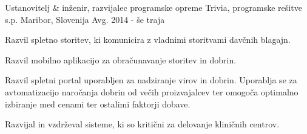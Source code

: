 \begin{cventries}
  \cventry
    {Ustanovitelj \& inženir, razvijalec programske opreme} %
    {Trivia, programske rešitve s.p.} %
    {Maribor, Slovenija} %
    {Avg. 2014 - še traja} %
    {
      \begin{cvitems} %
        \item {Razvil spletno storitev, ki komunicira z vladnimi storitvami
         davčnih blagajn.}
        \item {Razvil mobilno aplikacijo za obračunavanje storitev in dobrin.}
        \item {Razvil spletni portal uporabljen za nadziranje virov in dobrin.
         Uporablja se za avtomatizacijo naročanja dobrin od večih
          proizvajalcev ter omogoča optimalno izbiranje med cenami
           ter ostalimi faktorji dobave.}
        \item {Razvijal in vzdrževal sisteme, ki so kritični za delovanje
         kliničnih centrov.}
      \end{cvitems}
    }

\end{cventries}
